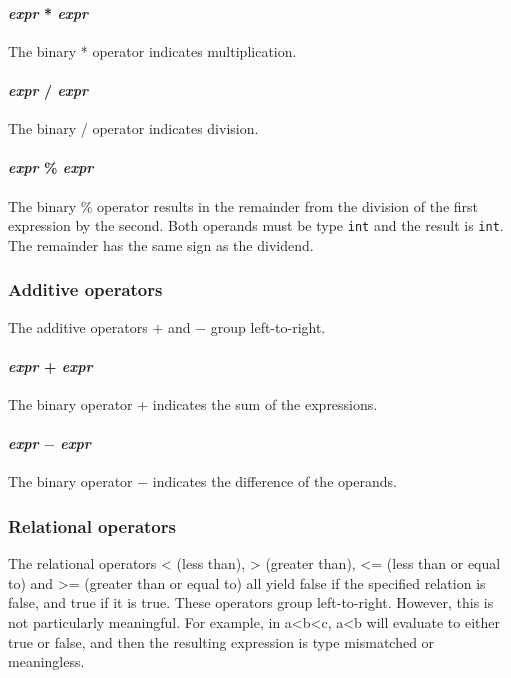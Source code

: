 \paragraph{\textit{expr} * \textit{expr}}
The binary * operator indicates multiplication.

\paragraph{\textit{expr} / \textit{expr}}
The binary / operator indicates division.

\paragraph{\textit{expr} \% \textit{expr}}
The  binary \% operator results in the remainder from the division of the first expression by the second. Both operands must be type \texttt{int} and the result is \texttt{int}. The remainder has the same sign as the dividend.
\\
\subsubsection{Additive operators}
The additive operators $+$ and $-$ group left-to-right.

\paragraph{\textit{expr} + \textit{expr}}
The binary  operator + indicates the sum of the expressions.

\paragraph{\textit{expr} $-$ \textit{expr}}
The binary operator $-$ indicates the difference of the operands.
\\
\subsubsection{Relational operators}
The  relational operators < (less than), > (greater than), <= (less than or equal to) and >= (greater than or equal to) all yield false if the specified relation is false, and true if it is true. These operators group left-to-right. However, this is not particularly meaningful. For example, in a<b<c, a<b will evaluate to either true or false, and then the resulting expression is type mismatched or meaningless.

